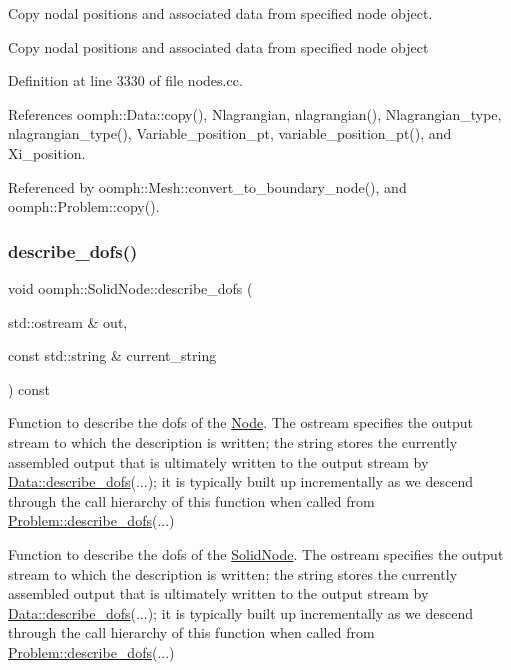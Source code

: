 Copy nodal positions and associated data from specified node object. 

Copy nodal positions and associated data from specified node object 

Definition at line 3330 of file nodes.\+cc.



References oomph\+::\+Data\+::copy(), Nlagrangian, nlagrangian(), Nlagrangian\+\_\+type, nlagrangian\+\_\+type(), Variable\+\_\+position\+\_\+pt, variable\+\_\+position\+\_\+pt(), and Xi\+\_\+position.



Referenced by oomph\+::\+Mesh\+::convert\+\_\+to\+\_\+boundary\+\_\+node(), and oomph\+::\+Problem\+::copy().

\mbox{\label{classoomph_1_1SolidNode_a93ba15b4ab3ccd1d0030179878df4330}} 
\subsubsection{\texorpdfstring{describe\+\_\+dofs()}{describe\_dofs()}}
{\footnotesize\ttfamily void oomph\+::\+Solid\+Node\+::describe\+\_\+dofs (\begin{DoxyParamCaption}\item[{std\+::ostream \&}]{out,  }\item[{const std\+::string \&}]{current\+\_\+string }\end{DoxyParamCaption}) const\hspace{0.3cm}{\ttfamily [virtual]}}



Function to describe the dofs of the \hyperlink{classoomph_1_1Node}{Node}. The ostream specifies the output stream to which the description is written; the string stores the currently assembled output that is ultimately written to the output stream by \hyperlink{classoomph_1_1Data_a2dae16e2dcff9a40029f834c83364df5}{Data\+::describe\+\_\+dofs}(...); it is typically built up incrementally as we descend through the call hierarchy of this function when called from \hyperlink{classoomph_1_1Problem_abc103804eb319ae0b3d43870cc3e1eaf}{Problem\+::describe\+\_\+dofs}(...) 

Function to describe the dofs of the \hyperlink{classoomph_1_1SolidNode}{Solid\+Node}. The ostream specifies the output stream to which the description is written; the string stores the currently assembled output that is ultimately written to the output stream by \hyperlink{classoomph_1_1Data_a2dae16e2dcff9a40029f834c83364df5}{Data\+::describe\+\_\+dofs}(...); it is typically built up incrementally as we descend through the call hierarchy of this function when called from \hyperlink{classoomph_1_1Problem_abc103804eb319ae0b3d43870cc3e1eaf}{Problem\+::describe\+\_\+dofs}(...) 

